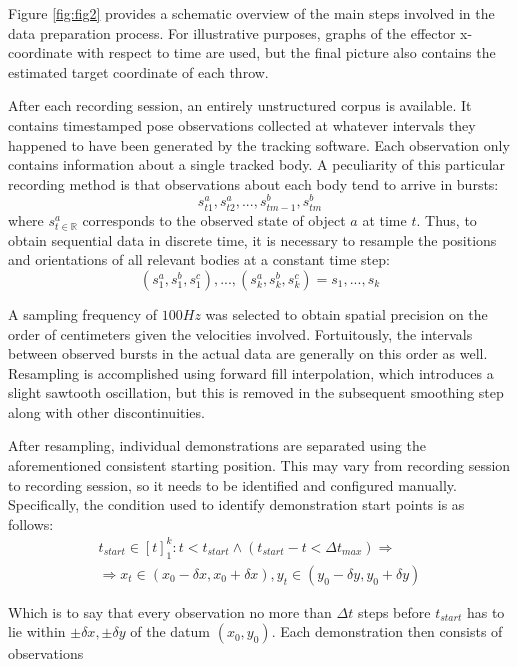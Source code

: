 \documentclass{article}
\begin{document}
Figure \ref{fig:fig2} provides a schematic overview of the main steps involved in the data preparation process. For illustrative purposes, graphs of the effector x-coordinate with respect to time are used, but the final picture also contains the estimated target coordinate of each throw.

After each recording session, an entirely unstructured corpus is available. It contains timestamped pose observations collected at whatever intervals they happened to have been generated by the tracking software. Each observation only contains information about a single tracked body. A peculiarity of this particular recording method is that observations about each body tend to arrive in bursts:
\begin{equation}
    s^a_{t1}, s^a_{t2}, ..., s^b_{tm-1}, s^b_{tm}
\end{equation}
where $s^a_{t \in \mathbb{R}}$ corresponds to the observed state of object $a$ at time $t$.
Thus, to obtain sequential data in discrete time, it is necessary to resample the positions and orientations of all relevant bodies at a constant time step:
\begin{equation}
    (s^a_{1}, s^b_{1}, s^c_{1}), ..., (s^a_{k}, s^b_{k}, s^c_{k}) = s_1, ..., s_k
\end{equation}

A sampling frequency of $100Hz$ was selected to obtain spatial precision on the order of centimeters given the velocities involved. Fortuitously, the intervals between observed bursts in the actual data are generally on this order as well. Resampling is accomplished using forward fill interpolation, which introduces a slight sawtooth oscillation, but this is removed in the subsequent smoothing step along with other discontinuities.

After resampling, individual demonstrations are separated using the aforementioned consistent starting position. This may vary from recording session to recording session, so it needs to be identified and configured manually. Specifically, the condition used to identify demonstration start points is as follows:
\begin{align}
	t_{start} \in [t]^k_1: t < t_{start} \land (t_{start} - t < \Delta t_{max}) \Rightarrow \nonumber \\
	\Rightarrow x_t \in (x_{0} - \delta x, x_{0} + \delta x ), y_t \in  (y_{0} - \delta y, y_{0} + \delta y )
\end{align}

Which is to say that every observation no more than $\Delta t$ steps before $t_{start}$ has to lie within $\pm \delta x, \pm \delta y$ of the datum $(x_0, y_0)$. Each demonstration then consists of observations 
\end{document}
